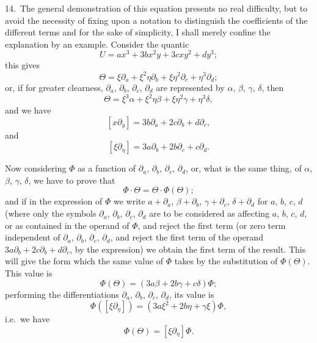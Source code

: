 \documentclass[11pt,a4paper]{article}
\begin{document}
\medskip

14.\ The general demonstration of this equation presents no real difficulty, but to avoid the necessity of fixing upon a notation to distinguish the coefficients of the different terms and for the sake of simplicity, I shall merely confine the explanation by an example. Consider the quantic
\[
U = ax^3 + 3bx^2y + 3cxy^2 + dy^3;
\]
this gives
\[
\Theta = \xi\partial_a + \xi^2\eta\partial_b + \xi\eta^2\partial_c + \eta^3\partial_d;
\]
or, if for greater clearness, $\partial_a$, $\partial_b$, $\partial_c$, $\partial_d$ are represented by $\alpha$, $\beta$, $\gamma$, $\delta$, then
\[
\Theta = \xi^3\alpha + \xi^2\eta\beta + \xi\eta^2\gamma + \eta^3\delta,
\]
and we have
\[
[x\partial_y] = 3b\partial_a + 2c\partial_b + d\partial_c,
\]
and
\[
[\xi\partial_\eta] = 3a\partial_b + 2b\partial_c + c\partial_d.
\]

\medskip

Now considering $\Phi$ as a function of $\partial_a$, $\partial_b$, $\partial_c$, $\partial_d$, or, what is the same thing, of $\alpha$, $\beta$, $\gamma$, $\delta$, we have to prove that
\[
\Phi\cdot \Theta = \Theta\cdot \Phi(\Theta);
\]
and if in the expression of $\Phi$ we write $a + \partial_a$, $\beta + \partial_b$, $\gamma + \partial_c$, $\delta + \partial_d$ for $a$, $b$, $c$, $d$ (where only the symbols $\partial_a$, $\partial_b$, $\partial_c$, $\partial_d$ are to be considered as affecting $a$, $b$, $c$, $d$, or as contained in the operand of $\Phi$, and reject the first term (or zero term independent of $\partial_a$, $\partial_b$, $\partial_c$, $\partial_d$, and reject the first term of the operand $3a\partial_b + 2c\partial_b + d\partial_c$, by the expression) we obtain the first term of the result. This will give the form which the same value of $\Phi$ takes by the substitution of $\Phi(\Theta)$. This value is
\[
\Phi(\Theta) = (3a\beta + 2b\gamma + c\delta)\Phi;
\]
performing the differentiations $\partial_a$, $\partial_b$, $\partial_c$, $\partial_d$, its value is
\[
\Phi([\xi\partial_\eta]) = (3a\xi^2 + 2b\eta + \gamma\xi)\Phi,
\]
i.e.\ we have
\[
\Phi(\Theta) = [\xi\partial_\eta]\Phi.
\]

\medskip
\end{document}
